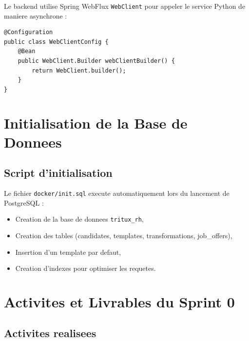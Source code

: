 Le backend utilise Spring WebFlux \texttt{WebClient} pour appeler le service Python de maniere asynchrone :

\begin{verbatim}
@Configuration
public class WebClientConfig {
    @Bean
    public WebClient.Builder webClientBuilder() {
        return WebClient.builder();
    }
}
\end{verbatim}

\section{Initialisation de la Base de Donnees}

\subsection{Script d'initialisation}

Le fichier \texttt{docker/init.sql} execute automatiquement lors du lancement de PostgreSQL :

\begin{itemize}
    \item Creation de la base de donnees \texttt{tritux\_rh},
    
    \item Creation des tables (candidates, templates, transformations, job\_offers),
    
    \item Insertion d'un template par defaut,
    
    \item Creation d'indexes pour optimiser les requetes.
\end{itemize}

\section{Activites et Livrables du Sprint 0}

\subsection{Activites realisees}

